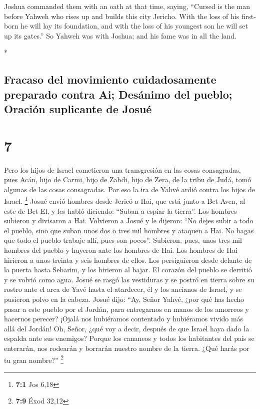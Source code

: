 \begin{paracol}{2}
\begin{otherlanguage}{english}
 Joshua commanded them with an oath at that time, saying,
``Cursed is the man before Yahweh who rises up and builds this city
Jericho. With the loss of his firstborn he will lay its foundation, and
with the loss of his youngest son he will set up its gates.''
 So Yahweh was with Joshua; and his fame was in all the
land.

\end{otherlanguage}

\switchcolumn[0]*

\hypertarget{fracaso-del-movimiento-cuidadosamente-preparado-contra-ai-desuxe1nimo-del-pueblo-oraciuxf3n-suplicante-de-josuuxe9}{%
\subsection{Fracaso del movimiento cuidadosamente preparado contra Ai;
Desánimo del pueblo; Oración suplicante de
Josué}\label{fracaso-del-movimiento-cuidadosamente-preparado-contra-ai-desuxe1nimo-del-pueblo-oraciuxf3n-suplicante-de-josuuxe9}}

\hypertarget{section-12}{%
\section{7}\label{section-12}}

 Pero los hijos de Israel cometieron una transgresión en
las cosas consagradas, pues Acán, hijo de Carmi, hijo de Zabdi, hijo de
Zera, de la tribu de Judá, tomó algunas de las cosas consagradas. Por
eso la ira de Yahvé ardió contra los hijos de Israel. \footnote{\textbf{7:1}
  Jos 6,18}  Josué envió hombres desde Jericó a Hai, que
está junto a Bet-Aven, al este de Bet-El, y les habló diciendo: ``Suban
a espiar la tierra''. Los hombres subieron y divisaron a Hai.
 Volvieron a Josué y le dijeron: ``No dejes subir a todo
el pueblo, sino que suban unos dos o tres mil hombres y ataquen a Hai.
No hagas que todo el pueblo trabaje allí, pues son pocos''.
 Subieron, pues, unos tres mil hombres del pueblo y
huyeron ante los hombres de Hai.  Los hombres de Hai
hirieron a unos treinta y seis hombres de ellos. Los persiguieron desde
delante de la puerta hasta Sebarim, y los hirieron al bajar. El corazón
del pueblo se derritió y se volvió como agua.  Josué se
rasgó las vestiduras y se postró en tierra sobre su rostro ante el arca
de Yavé hasta el atardecer, él y los ancianos de Israel, y se pusieron
polvo en la cabeza.  Josué dijo: ``Ay, Señor Yahvé, ¿por
qué has hecho pasar a este pueblo por el Jordán, para entregarnos en
manos de los amorreos y hacernos perecer? ¡Ojalá nos hubiéramos
contentado y hubiéramos vivido más allá del Jordán!  Oh,
Señor, ¿qué voy a decir, después de que Israel haya dado la espalda ante
sus enemigos?  Porque los cananeos y todos los habitantes
del país se enterarán, nos rodearán y borrarán nuestro nombre de la
tierra. ¿Qué harás por tu gran nombre?'' \footnote{\textbf{7:9} Éxod
  32,12}


\end{paracol}
